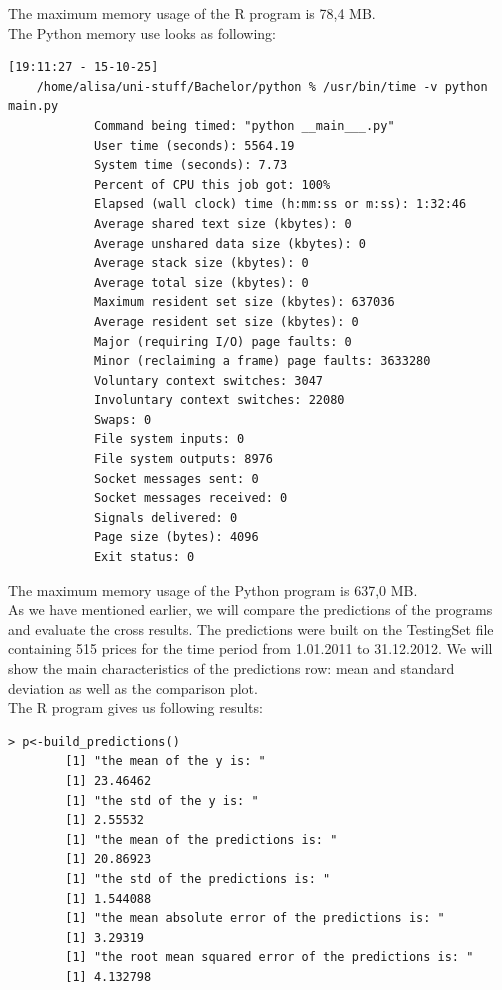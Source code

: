 \documentclass[
  twoside,
  11pt, a4paper,
  footinclude=true,
  headinclude=true,
  cleardoublepage=empty
]{scrreprt}
\begin{document}
    The maximum memory usage of the R program is 78,4 MB.\\
    The Python memory use looks as following:
    \begin{lstlisting}[basicstyle=\footnotesize]
    [19:11:27 - 15-10-25] 
    /home/alisa/uni-stuff/Bachelor/python % /usr/bin/time -v python main.py
            Command being timed: "python __main___.py"
            User time (seconds): 5564.19
            System time (seconds): 7.73
            Percent of CPU this job got: 100%
            Elapsed (wall clock) time (h:mm:ss or m:ss): 1:32:46
            Average shared text size (kbytes): 0
            Average unshared data size (kbytes): 0
            Average stack size (kbytes): 0
            Average total size (kbytes): 0
            Maximum resident set size (kbytes): 637036
            Average resident set size (kbytes): 0
            Major (requiring I/O) page faults: 0
            Minor (reclaiming a frame) page faults: 3633280
            Voluntary context switches: 3047
            Involuntary context switches: 22080
            Swaps: 0
            File system inputs: 0
            File system outputs: 8976
            Socket messages sent: 0
            Socket messages received: 0
            Signals delivered: 0
            Page size (bytes): 4096
            Exit status: 0
    \end{lstlisting}
    The maximum memory usage of the Python program is 637,0 MB.\\
    As we have mentioned earlier, we will compare the predictions of the programs and evaluate the cross results. The predictions were built on the TestingSet file containing 515 prices for the time period from 1.01.2011 to 31.12.2012. We will show the main characteristics of the predictions row: mean and standard deviation as well as the comparison plot.\\
    The R program gives us following results:
    \begin{lstlisting}[basicstyle=\footnotesize]
        > p<-build_predictions()
        [1] "the mean of the y is: "
        [1] 23.46462
        [1] "the std of the y is: "
        [1] 2.55532
        [1] "the mean of the predictions is: "
        [1] 20.86923
        [1] "the std of the predictions is: "
        [1] 1.544088
        [1] "the mean absolute error of the predictions is: "
        [1] 3.29319
        [1] "the root mean squared error of the predictions is: "
        [1] 4.132798
    \end{lstlisting}
\end{document}
